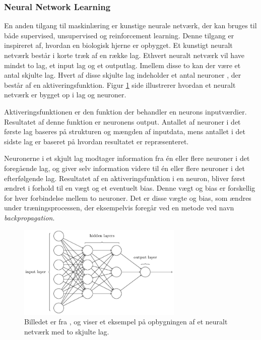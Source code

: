 \subsubsection{Neural Network Learning} %
En anden tilgang til maskinlæring er kunstige neurale netværk, der kan bruges til både supervised, unsupervised og reinforcement learning. Denne tilgang er inspireret af, hvordan en biologisk hjerne er opbygget. Et kunstigt neuralt netværk består i korte træk af en række lag. Ethvert neuralt netværk vil have mindst to lag, et input lag og et outputlag. Imellem disse to kan der være et antal skjulte lag. Hvert af disse skjulte lag indeholder et antal neuroner \cite{E1997}, der består af en aktiveringsfunktion. Figur \ref{NeuralNet} side \pageref{NeuralNet} illustrerer hvordan et neuralt netværk er bygget op i lag og neuroner.
\par
Aktiveringsfunktionen er den funktion der behandler en neurons inputværdier. Resultatet af denne funktion er neuronens output. Antallet af neuroner i det første lag baseres på strukturen og mængden af inputdata, mens antallet i det sidste lag er baseret på hvordan resultatet er repræsenteret.
\par
Neuronerne i et skjult lag modtager information fra én eller flere neuroner i det foregående lag, og giver selv information videre til én eller flere neuroner i det efterfølgende lag. Resultatet af en aktiveringsfunktion i en neuron, bliver først ændret i forhold til en vægt og et eventuelt bias. Denne vægt og bias er forskellig for hver forbindelse mellem to neuroner. Det er disse vægte og bias, som ændres under træningsprocessen, der eksempelvis foregår ved en metode ved navn \textit{backpropagation}.
\begin{figure}[H]
    \centering
    \includegraphics[width=0.7\textwidth]{figures/NeuralNetIMG.PNG}
    \caption{Billedet er fra \cite{Nielsen2015}, og viser et eksempel på opbygningen af et neuralt netværk med to skjulte lag.}
    \label{NeuralNet}
\end{figure}
